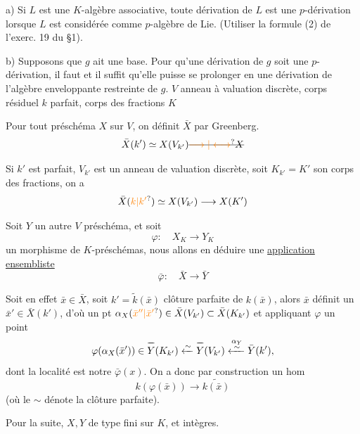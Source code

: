 a) Si $L$ est une $K$-algèbre associative, toute dérivation de $L$ est une $p$-dérivation lorsque $L$ est considérée comme $p$-algèbre de Lie. (Utiliser la formule (2) de l'exerc. 19 du \S 1).

b) Supposons que $g$ ait une base. Pour qu'une dérivation de $g$ soit une $p$-dérivation, il faut et il suffit qu'elle puisse se prolonger en une dérivation de l'algèbre enveloppante restreinte de $g$.
$V$ anneau à valuation discrète, corps résiduel $k$ parfait, corps des fractions $K$

Pour tout préschéma $X$ sur $V$, on définit $\bar X$ par Greenberg.
\[
\bar X(k')\simeq X(V_{k'})\deleted{\unsure{\longrightarrow|\longleftrightarrow}X}
\]

Si $k'$ est parfait, $V_{k'}$ est un anneau de valuation discrète, soit $K_{k'}=K'$ son corps des fractions, on a
\[
\bar X(\unsure{k|k'})\simeq X(V_{k'})\longrightarrow X(K')
\]

Soit  $Y$ un autre $V$ préschéma,  et soit
\[
\varphi:\quad X_K\longrightarrow Y_K
\]
un morphisme de $K$-préschémas, nous allons en déduire une \uline{application ensembliste}
\[
\bar\varphi:\quad\bar X\longrightarrow\bar Y
\]

Soit en effet $\bar x\in\bar X$, soit $k'=\tilde{k}(\bar x)$  clôture parfaite de $k(\bar x)$, alors $\bar x$ définit un  $\bar x'\in\bar X(k')$, d'où un pt  $\alpha_X(\unsure{\bar x''|\bar x'})\in\bar X(V_{k'})\subset\bar X(K_{k'})$ et appliquant $\varphi$ un point
\[
\varphi(\alpha_X(\bar x'))\in\overset{\deleted{\mathord{-}}}{Y}(K_{k'})
\xleftarrow{\sim}\overset{\deleted{\mathord{-}}}{Y}(V_{k'})
\xleftarrow{\substack{\alpha_Y\\\sim}}\bar Y(k'),
\]
dont la localité est notre $\bar\varphi(x)$. On a donc par construction un hom
\[
k(\varphi(\bar x))\longrightarrow\widetilde{k(\bar x)}
\]
(où le $\sim$ dénote la clôture parfaite).

Pour la suite, $X,Y$ de type fini sur $K$, et  intègres.


